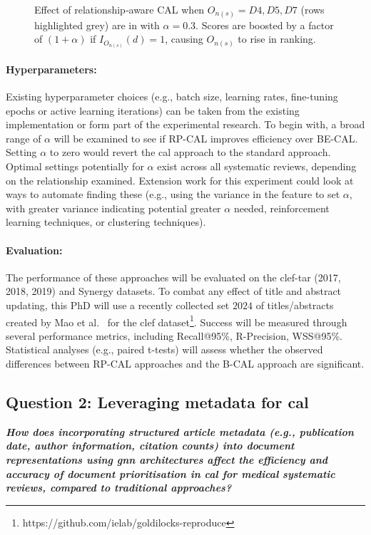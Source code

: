 \documentclass[10pt,oneside]{book}
\begin{document}
\begin{figure}[h!]

\caption{Effect of relationship‐aware CAL when $O_{n(s)} = {D4, D5, D7}$ (rows highlighted grey) are in  with $\alpha = 0.3$. Scores are boosted by a factor of $(1+\alpha)$ if $I_{O_{n(s)}}(d)=1$, causing  $O_{n(s)}$ to rise in ranking.}
\label{fig:relationship_aware_example}
\end{figure}

\paragraph{Hyperparameters:}
Existing hyperparameter choices (e.g., batch size, learning rates, fine-tuning epochs or active learning iterations) can be taken from the existing implementation or form part of the experimental research. To begin with, a broad range of $\alpha$ will be examined to see if RP-CAL improves efficiency over BE-CAL. Setting $\alpha$ to zero would revert the \gls*{cal} approach to the standard approach. Optimal settings potentially for $\alpha$ exist across all systematic reviews, depending on the relationship examined. Extension work for this experiment could look at ways to automate finding these (e.g., using the variance in the feature to set $\alpha$, with greater variance indicating potential greater $\alpha$ needed, reinforcement learning techniques, or clustering techniques).

\paragraph{Evaluation:}
The performance of these approaches will be evaluated on the \gls*{clef}-\gls*{tar} (2017, 2018, 2019) and Synergy datasets. To combat any effect of title and abstract updating, this PhD will use a recently collected set \(2024\) of titles/abstracts created by Mao et al.~\cite{mao_reproducibility_2024} for the \gls*{clef} dataset\footnote{https://github.com/ielab/goldilocks-reproduce}. Success will be measured through several performance metrics, including Recall@95\%, R-Precision, WSS@95\%. Statistical analyses (e.g., paired t-tests) will assess whether the observed differences between RP-CAL approaches and the B-CAL approach are significant.

\subsection{Question 2: Leveraging metadata for \gls*{cal}}
\begin{tcolorbox}[colback=lightgreen!10, colframe=lightgreen, sharp corners=southwest, boxrule=0.8pt]
\emph{\textbf{How does incorporating structured article metadata (e.g., publication date, author information, citation counts) into document representations using \gls*{gnn} architectures affect the efficiency and accuracy of document prioritisation in \gls*{cal} for medical systematic reviews, compared to traditional approaches?}}
\end{tcolorbox}
\end{document}
